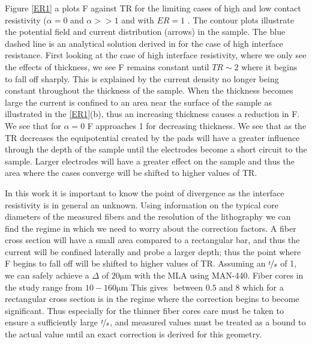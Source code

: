 Figure \ref{ER1} a plots F against TR for the limiting cases of high and low contact resistivity ($\alpha = 0$ and $\alpha >> 1$ and with $ER = 1$ . The contour plots illustrate the potential field and current distribution (arrows) in the sample. The blue dashed line is an analytical solution derived in \cite{} for the case of high interface resistance. First looking at the case of high interface resistivity, where we only see the effects of thickness, we see F remains constant until $TR \sim 2$ where it begins to fall off sharply. This is explained by the current density no longer being constant throughout the thickness of the sample. When the thickness becomes large the current is confined to an area near the surface of the sample as illustrated in the \ref{ER1}(b), thus an increasing thickness causes a reduction in F. 
We see that for $\alpha = 0$ F approaches 1 for decreasing thickness. We see that as the TR decreases the equipotential created by the pads will have a greater influence through the depth of the sample until the electrodes become a short circuit to the sample. Larger electrodes will have a greater effect on the sample and thus the area where the cases converge will be shifted to higher values of TR. 

In this work it is important to know the point of divergence as the interface resistivity is in general an unknown. Using information on the typical core diameters of the measured fibers and the resolution of the lithography we can find the regime in which we need to worry about the correction factors. A fiber cross section will have a small area compared to a rectangular bar, and thus the current will be confined laterally and probe a larger depth; thus the point where F begins to fall off will be shifted to higher values of TR. Assuming an $\nicefrac{t}{s}$ of 1, we can safely achieve a $\Delta$ of $20\si{\micro\meter}$ with the MLA using MAN-440. Fiber cores in the study range from  $10-160 \si{\micro\meter}$ This gives $ $ between $0.5$ and $8$ which for a rectangular cross section is in the regime where the correction begins to become significant. Thus especially for the thinner fiber cores care must be taken to ensure a sufficiently large $\nicefrac{t}{s}$, and measured values must be treated as a bound to the actual value until an exact correction is derived for this geometry.  
\cleardoublepage